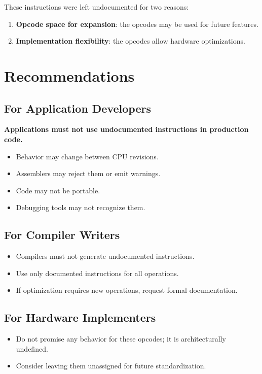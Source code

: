 These instructions were left undocumented for two reasons:

\begin{enumerate}
	\item \textbf{Opcode space for expansion}: the opcodes may be used for future features.
	\item \textbf{Implementation flexibility}: the opcodes allow hardware optimizations.
\end{enumerate}

\section{Recommendations}

\subsection{For Application Developers}

\textbf{Applications must not use undocumented instructions in production code.}

\begin{itemize}
	\item Behavior may change between CPU revisions.
	\item Assemblers may reject them or emit warnings.
	\item Code may not be portable.
	\item Debugging tools may not recognize them.
\end{itemize}

\subsection{For Compiler Writers}

\begin{itemize}
	\item Compilers must not generate undocumented instructions.
	\item Use only documented instructions for all operations.
	\item If optimization requires new operations, request formal documentation.
\end{itemize}

\subsection{For Hardware Implementers}

\begin{itemize}
	\item Do not promise any behavior for these opcodes; it is architecturally undefined.
	\item Consider leaving them unassigned for future standardization.
\end{itemize}


